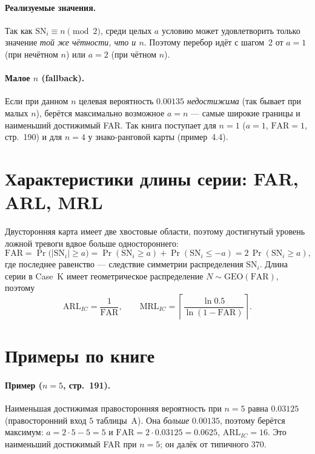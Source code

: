 \documentclass[11pt,a4paper]{article}
\newcommand{\SN}{\mathrm{SN}}
\newcommand{\FAR}{\mathrm{FAR}}
\newcommand{\ARL}{\mathrm{ARL}}
\newcommand{\MRL}{\mathrm{MRL}}
\begin{document}
\paragraph{Реализуемые значения.}
Так как $\SN_i\equiv n\pmod 2$, среди целых $a$ условию может
удовлетворить только значение \emph{той же чётности, что и $n$}.
Поэтому перебор идёт с шагом~2 от $a=1$ (при нечётном $n$) или $a=2$
(при чётном $n$).

\paragraph{Малое $n$ (fallback).}
Если при данном $n$ целевая вероятность $0.00135$ \emph{недостижима}
(так бывает при малых $n$), берётся максимально возможное $a=n$ ---
самые широкие границы и наименьший достижимый FAR. Так книга поступает
для $n=1$ ($a=1$, $\FAR=1$, стр.~190) и для $n=4$ у знако-ранговой карты
(пример~4.4).

\section{Характеристики длины серии: FAR, ARL, MRL}

Двусторонняя карта имеет две хвостовые области, поэтому достигнутый
уровень ложной тревоги вдвое больше одностороннего:
\begin{equation}
\FAR=\Pr\bigl(|\SN_i|\ge a\bigr)
    =\Pr(\SN_i\ge a)+\Pr(\SN_i\le -a)
    = 2\,\Pr(\SN_i\ge a),
\label{eq:snfar}
\end{equation}
где последнее равенство --- следствие симметрии распределения $\SN_i$.
Длина серии в Case~K имеет геометрическое распределение
$N\sim\mathrm{GEO}(\FAR)$, поэтому
\begin{equation}
\ARL_{IC}=\frac{1}{\FAR},
\qquad
\MRL_{IC}=\left\lceil\frac{\ln 0.5}{\ln(1-\FAR)}\right\rceil .
\label{eq:snarl}
\end{equation}

\section{Примеры по книге}

\paragraph{Пример ($n=5$, стр.~191).}
Наименьшая достижимая правосторонняя вероятность при $n=5$ равна
$0.03125$ (правосторонний вход $5$ таблицы~A). Она \emph{больше}
$0.00135$, поэтому берётся максимум: $a=2\cdot 5-5=5$ и
$\FAR=2\cdot0.03125=0.0625$, $\ARL_{IC}=16$. Это наименьший достижимый
FAR при $n=5$; он далёк от типичного $370$.
\end{document}
